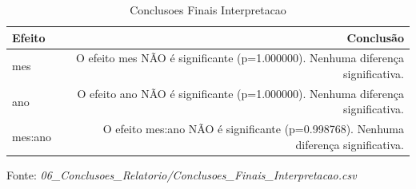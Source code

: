 \begin{table}[H]
\centering
\small
\caption{Conclusoes Finais Interpretacao}
\label{tab:09_06_Conclusoes_Relatorio}
\begin{tabular}{|l|r|}
\hline
\textbf{Efeito} & \textbf{Conclusão} \\
\hline
mes & O efeito mes NÃO é significante (p=1.000000). Nenhuma diferença significativa. \\
ano & O efeito ano NÃO é significante (p=1.000000). Nenhuma diferença significativa. \\
mes:ano & O efeito mes:ano NÃO é significante (p=0.998768). Nenhuma diferença significativa. \\
\hline
\end{tabular}
\begin{flushleft}
\small Fonte: \textit{06_Conclusoes_Relatorio/Conclusoes_Finais_Interpretacao.csv}
\end{flushleft}
\end{table}
